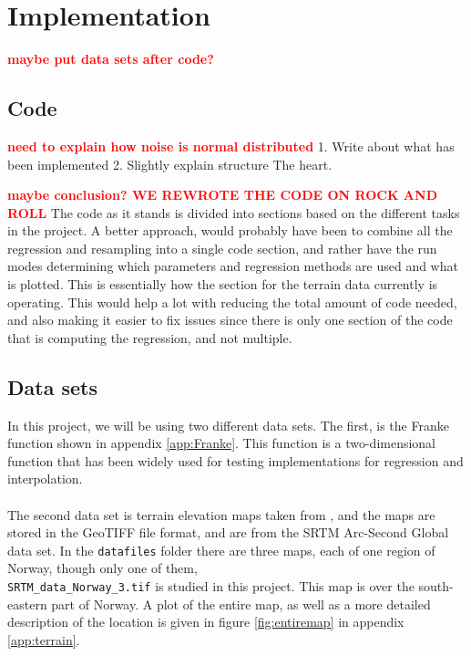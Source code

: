 \documentclass[a4paper]{article}
\newcommand\red[1]{\textcolor{red}{\textbf{#1}}}
\begin{document}
\section{Implementation} \label{chap:implement}
\red{maybe put data sets after code?}
\subsection{Code}
\red{need to explain how noise is normal distributed}
1. Write about what has been implemented
2. Slightly explain structure
The heart. \cite{Github1}

\red{maybe conclusion? WE REWROTE THE CODE ON ROCK AND ROLL}
The code as it stands is divided into sections based on the different tasks in the project. A better approach, would probably have been to combine all the regression and resampling into a single code section, and rather have the run modes determining which parameters and regression methods are used and what is plotted. This is essentially how the section for the terrain data currently is operating. This would help a lot with reducing the total amount of code needed, and also making it easier to fix issues since there is only one section of the code that is computing the regression, and not multiple.
\subsection{Data sets}
In this project, we will be using two different data sets. The first, is the Franke function shown in appendix \ref{app:Franke}. This function is a two-dimensional function that has been widely used for testing implementations for regression and interpolation.
\\\\
The second data set is terrain elevation maps taken from \cite{terrain}, and the maps are stored in the GeoTIFF file format, and are from the SRTM Arc-Second Global data set. In the \texttt{datafiles} folder there are three maps, each of one region of Norway, though only one of them, \\\texttt{SRTM\_data\_Norway\_3.tif} is studied in this project. This map is over the south-eastern part of Norway. A plot of the entire map, as well as a more detailed description of the location is given in figure \ref{fig:entiremap} in appendix \ref{app:terrain}.
\end{document}

